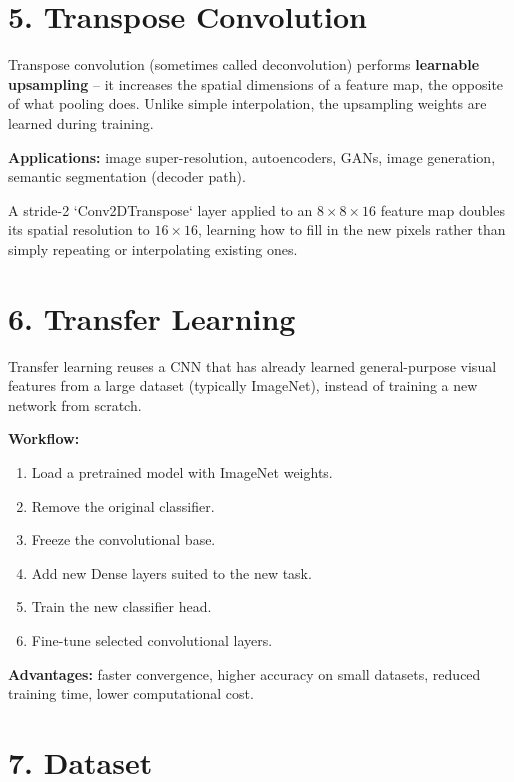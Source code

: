 \documentclass[11pt]{article}
\begin{document}
\section*{5. Transpose Convolution}

Transpose convolution (sometimes called deconvolution) performs \textbf{learnable upsampling} -- it increases the spatial dimensions of a feature map, the opposite of what pooling does. Unlike simple interpolation, the upsampling weights are learned during training.

\textbf{Applications:} image super-resolution, autoencoders, GANs, image generation, semantic segmentation (decoder path).

A stride-2 `Conv2DTranspose` layer applied to an $8\times8\times16$ feature map doubles its spatial resolution to $16\times16$, learning how to fill in the new pixels rather than simply repeating or interpolating existing ones.


\section*{6. Transfer Learning}

Transfer learning reuses a CNN that has already learned general-purpose visual features from a large dataset (typically ImageNet), instead of training a new network from scratch.

\textbf{Workflow:}
\begin{enumerate}[leftmargin=*]
\item Load a pretrained model with ImageNet weights.
\item Remove the original classifier.
\item Freeze the convolutional base.
\item Add new Dense layers suited to the new task.
\item Train the new classifier head.
\item Fine-tune selected convolutional layers.
\end{enumerate}

\textbf{Advantages:} faster convergence, higher accuracy on small datasets, reduced training time, lower computational cost.


\section*{7. Dataset}
\end{document}
